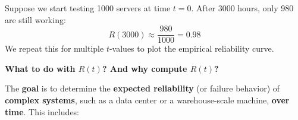 \highspace
\begin{examplebox}
    Suppose we start testing 1000 servers at time $t = 0$. After 3000 hours, only 980 are still working:
    \begin{equation*}
        R(3000) \approx \dfrac{980}{1000} = 0.98
    \end{equation*}
    We repeat this for multiple $t$-values to plot the empirical reliability curve.
\end{examplebox}

\highspace
\begin{flushleft}
    \textcolor{Green3}{ \textbf{What to do with $R(t)$? And why compute $R(t)$?}}
\end{flushleft}
The \textbf{goal} is to determine the \textbf{expected reliability} (or failure behavior) of \textbf{complex systems}, such as a data center or a warehouse-scale machine, \textbf{over time}. This includes:

